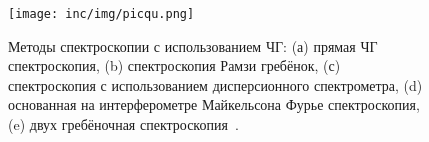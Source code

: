 \begin{figure}[ht]
  \centering
  \texttt{[image: inc/img/picqu.png]}
  \caption{Методы спектроскопии с использованием ЧГ: (а) прямая ЧГ спектроскопия, (b) спектроскопия Рамзи гребёнок, (с) спектроскопия с использованием дисперсионного спектрометра, (d) основанная на интерферометре Майкельсона Фурье спектроскопия, (e) двух гребёночная спектроскопия~\cite{Picqu2019}.}
  \label{fig:picqu}
\end{figure}